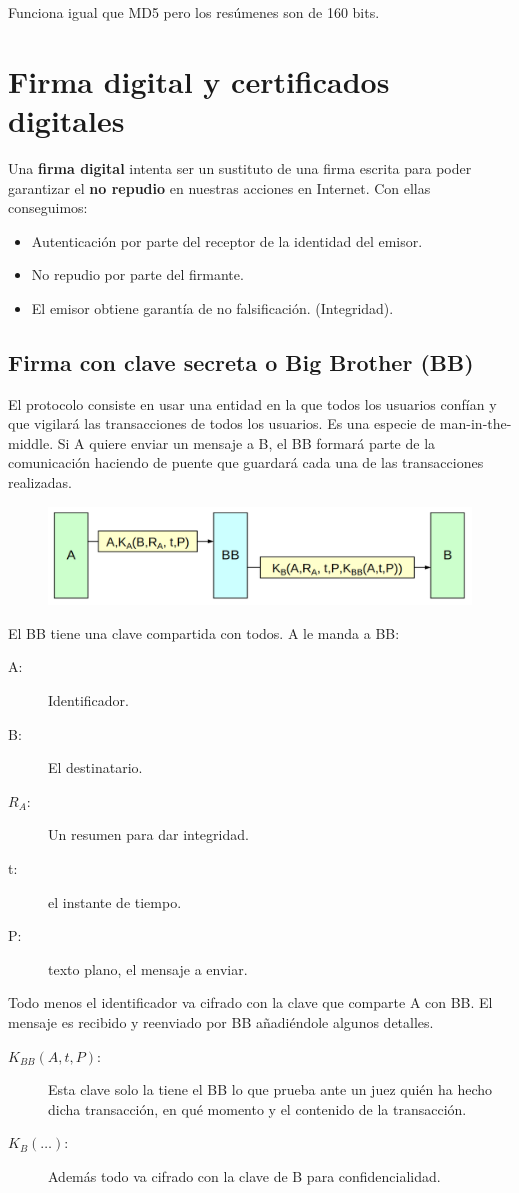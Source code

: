 Funciona igual que MD5 pero los resúmenes son de 160 bits. 


\section{Firma digital y certificados digitales}

Una \textbf{firma digital} intenta ser un sustituto de una firma escrita para poder garantizar el \textbf{no repudio} en nuestras acciones en Internet. Con ellas conseguimos:
\begin{itemize}
    \item Autenticación por parte del receptor de la identidad del emisor.
    \item No repudio por parte del firmante.
    \item El emisor obtiene garantía de no falsificación. (Integridad).
\end{itemize}

\subsection{Firma con clave secreta o Big Brother (BB)}

El protocolo consiste en usar una entidad en la que todos los usuarios confían y que vigilará las transacciones de todos los usuarios. Es una especie de man-in-the-middle. Si A quiere enviar un mensaje a B, el BB formará parte de la comunicación haciendo de puente que guardará cada una de las transacciones realizadas. 

\begin{figure}[H]
    \centering
    \includegraphics[width=0.8\linewidth]{./images/big-brother.png}
    \label{fig:big-brother}
\end{figure}

El BB tiene una clave compartida con todos. A le manda a BB:
\begin{description}
    \item [A:]Identificador.
    \item [B:] El destinatario.
    \item [$R_A$:] Un resumen para dar integridad.
    \item [t:] el instante de tiempo.
    \item [P:] texto plano, el mensaje a enviar. 
\end{description}
Todo menos el identificador va cifrado con la clave que comparte A con BB. El mensaje es recibido y reenviado por BB añadiéndole algunos detalles.
\begin{description}
    \item [$K_{BB}(A,t,P)$:] Esta clave solo la tiene el BB lo que prueba ante un juez quién ha hecho dicha transacción, en qué momento y el contenido de la transacción.  
    \item [$K_B(\ldots)$:] Además todo va cifrado con la clave de B para confidencialidad. 
\end{description}


